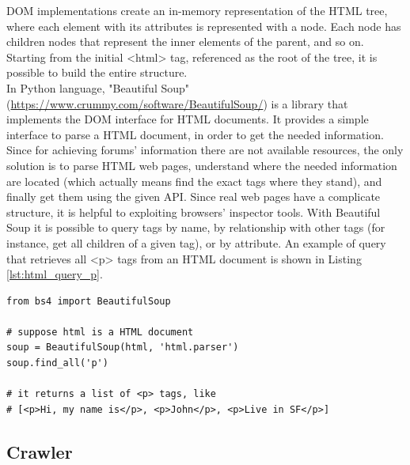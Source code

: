 \ac{DOM} implementations create an in-memory representation of the \ac{HTML} tree, where each element with its attributes is represented with a node. Each node has children nodes that represent the inner elements of the parent, and so on. Starting from the initial <html> tag, referenced as the root of the tree, it is possible to build the entire structure.\\

In Python language, "Beautiful Soup" (\url{https://www.crummy.com/software/BeautifulSoup/}) is a library that implements the \ac{DOM} interface for \ac{HTML} documents. It provides a simple interface to parse a \ac{HTML} document, in order to get the needed information. Since for achieving forums' information there are not available resources, the only solution is to parse \ac{HTML} web pages, understand where the needed information are located (which actually means find the exact tags where they stand), and finally get them using the given \ac{API}. Since real web pages have a complicate structure, it is helpful to exploiting browsers'  inspector tools. With Beautiful Soup it is possible to query tags by name, by relationship with other tags (for instance, get all children of a given tag), or by attribute. An example of query that retrieves all <p> tags from an \ac{HTML} document is shown in Listing \ref{lst:html_query_p}.

\lstset{language=Python}
\lstset{frame=lines}
\lstset{basicstyle=\footnotesize}
\begin{lstlisting}
from bs4 import BeautifulSoup

# suppose html is a HTML document
soup = BeautifulSoup(html, 'html.parser')
soup.find_all('p')

# it returns a list of <p> tags, like
# [<p>Hi, my name is</p>, <p>John</p>, <p>Live in SF</p>]
\end{lstlisting}


\subsection{Crawler}

